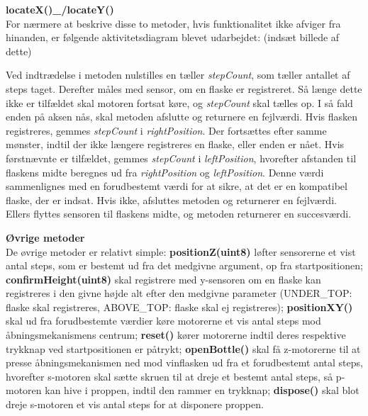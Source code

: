 \textbf{locateX()_/locateY()} \\
For nærmere at beskrive disse to metoder, hvis funktionalitet ikke afviger fra hinanden, er følgende aktivitetsdiagram blevet udarbejdet: (indsæt billede af dette)

Ved indtrædelse i metoden nulstilles en tæller \textit{stepCount}, som tæller antallet af steps taget. Derefter måles med sensor, om en flaske er registreret. Så længe dette ikke er tilfældet skal motoren fortsat køre, og \textit{stepCount} skal tælles op. I så fald enden på aksen nås, skal metoden afslutte og returnere en fejlværdi. Hvis flasken registreres, gemmes \textit{stepCount} i \textit{rightPosition}. Der fortsættes efter samme mønster, indtil der ikke længere registreres en flaske, eller enden er nået. Hvis førstnævnte er tilfældet, gemmes \textit{stepCount} i \textit{leftPosition}, hvorefter afstanden til flaskens midte beregnes ud fra \textit{rightPosition} og \textit{leftPosition}. Denne værdi sammenlignes med en forudbestemt værdi for at sikre, at det er en kompatibel flaske, der er indsat. Hvis ikke, afsluttes metoden og returnerer en fejlværdi. Ellers flyttes sensoren til flaskens midte, og metoden returnerer en succesværdi.

\textbf{Øvrige metoder} \\
De øvrige metoder er relativt simple: \textbf{positionZ(uint8)} løfter sensorerne et vist antal steps, som er bestemt ud fra det medgivne argument, op fra startpositionen; \textbf{confirmHeight(uint8)} skal registrere med y-sensoren om en flaske kan registreres i den givne højde alt efter den medgivne parameter (UNDER_TOP: flaske skal registreres, ABOVE_TOP: flaske skal ej registreres); \textbf{positionXY()} skal ud fra forudbestemte værdier køre motorerne et vis antal steps mod åbningsmekanismens centrum; \textbf{reset()} kører motorerne indtil deres  respektive trykknap ved startpositionen er påtrykt; \textbf{openBottle()} skal få z-motorerne til at presse åbningsmekanismen ned mod vinflasken ud fra et forudbestemt antal steps, hvorefter s-motoren skal sætte skruen til at dreje et bestemt antal steps, så p-motoren kan hive i proppen, indtil den rammer en trykknap; \textbf{dispose()} skal blot dreje s-motoren et vis antal steps for at disponere proppen.
